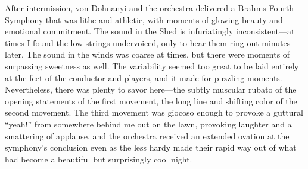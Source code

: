 After intermission, von Dohnanyi and the orchestra delivered a Brahms Fourth Symphony that was lithe and athletic, with moments of glowing beauty and emotional commitment. The sound in the Shed is infuriatingly inconsistent—at times I found the low strings undervoiced, only to hear them ring out minutes later. The sound in the winds was coarse at times, but there were moments of surpassing sweetness as well. The variability seemed too great to be laid entirely at the feet of the conductor and players, and it made for puzzling moments. Nevertheless, there was plenty to savor here—the subtly muscular rubato of the opening statements of the first movement, the long line and shifting color of the second movement. The third movement was giocoso enough to provoke a guttural “yeah!” from somewhere behind me out on the lawn, provoking laughter and a smattering of applause, and the orchestra received an extended ovation at the symphony’s conclusion even as the less hardy made their rapid way out of what had become a beautiful but surprisingly cool night.